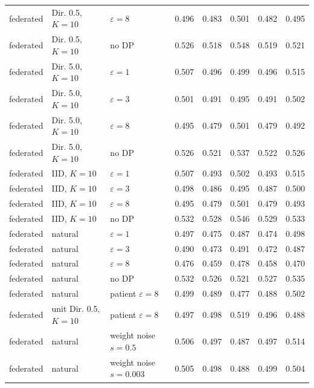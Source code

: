 {\begin{longtable}{lllrrrrr}
federated & Dir. 0.5, $K{=}10$ & $\varepsilon=8$ & 0.496 & 0.483 & 0.501 & 0.482 & 0.495 \\
federated & Dir. 0.5, $K{=}10$ & no DP & 0.526 & 0.518 & 0.548 & 0.519 & 0.521 \\
federated & Dir. 5.0, $K{=}10$ & $\varepsilon=1$ & 0.507 & 0.496 & 0.499 & 0.496 & 0.515 \\
federated & Dir. 5.0, $K{=}10$ & $\varepsilon=3$ & 0.501 & 0.491 & 0.495 & 0.491 & 0.502 \\
federated & Dir. 5.0, $K{=}10$ & $\varepsilon=8$ & 0.495 & 0.479 & 0.501 & 0.479 & 0.492 \\
federated & Dir. 5.0, $K{=}10$ & no DP & 0.526 & 0.521 & 0.537 & 0.522 & 0.526 \\
federated & IID, $K{=}10$ & $\varepsilon=1$ & 0.507 & 0.493 & 0.502 & 0.493 & 0.515 \\
federated & IID, $K{=}10$ & $\varepsilon=3$ & 0.498 & 0.486 & 0.495 & 0.487 & 0.500 \\
federated & IID, $K{=}10$ & $\varepsilon=8$ & 0.495 & 0.479 & 0.501 & 0.479 & 0.493 \\
federated & IID, $K{=}10$ & no DP & 0.532 & 0.528 & 0.546 & 0.529 & 0.533 \\
federated & natural & $\varepsilon=1$ & 0.497 & 0.475 & 0.487 & 0.474 & 0.498 \\
federated & natural & $\varepsilon=3$ & 0.490 & 0.473 & 0.491 & 0.472 & 0.487 \\
federated & natural & $\varepsilon=8$ & 0.476 & 0.459 & 0.478 & 0.458 & 0.470 \\
federated & natural & no DP & 0.532 & 0.526 & 0.521 & 0.527 & 0.535 \\
federated & natural & patient $\varepsilon=8$ & 0.499 & 0.489 & 0.477 & 0.488 & 0.502 \\
federated & unit Dir. 0.5, $K{=}10$ & patient $\varepsilon=8$ & 0.497 & 0.498 & 0.519 & 0.496 & 0.488 \\
federated & natural & weight noise $s=0.5$ & 0.506 & 0.497 & 0.487 & 0.497 & 0.514 \\
federated & natural & weight noise $s=0.003$ & 0.505 & 0.498 & 0.488 & 0.499 & 0.504 \\
\end{longtable}}

